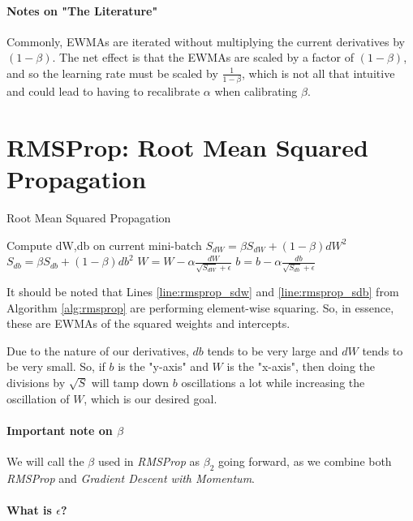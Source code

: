 \documentclass{article}
\begin{document}
\paragraph{Notes on "The Literature"}

Commonly, EWMAs are iterated without multiplying the current derivatives by $(1-\beta)$.  The net effect is that the EWMAs are scaled by a factor of $(1-\beta)$, and so the learning rate must be scaled by $\frac{1}{1-\beta}$, which is not all that intuitive and could lead to having to recalibrate $\alpha$ when calibrating $\beta$.

\section{RMSProp: Root Mean Squared Propagation}

\begin{algorithm}[h]
\label{alg:rmsprop}
\caption{Root Mean Squared Propagation}
Compute dW,db on current mini-batch \;
$S_{dW} = \beta S_{dW} + (1-\beta) dW^2$ \; \label{line:rmsprop_sdw}
$S_{db} = \beta S_{db} + (1-\beta) db^2$ \; \label{line:rmsprop_sdb}
$W = W - \alpha \frac{dW}{\sqrt{S_{dW}} + \epsilon}$ \;
$b = b - \alpha \frac{db}{\sqrt{S_{db}} + \epsilon}$ \;
\end{algorithm}

It should be noted that Lines \ref{line:rmsprop_sdw} and \ref{line:rmsprop_sdb} from Algorithm \ref{alg:rmsprop} are performing element-wise squaring.  So, in essence, these are EWMAs of the squared weights and intercepts.

Due to the nature of our derivatives, $db$ tends to be very large and $dW$ tends to be very small.  So, if $b$ is the "y-axis" and $W$ is the "x-axis", then doing the divisions by $\sqrt{S}$ will tamp down $b$ oscillations a lot while increasing the oscillation of $W$, which is our desired goal.

\paragraph{Important note on $\beta$}

We will call the $\beta$ used in \textit{RMSProp} as $\beta_2$ going forward, as we combine both \textit{RMSProp} and \textit{Gradient Descent with Momentum}.

\paragraph{What is $\epsilon$?}
\end{document}

